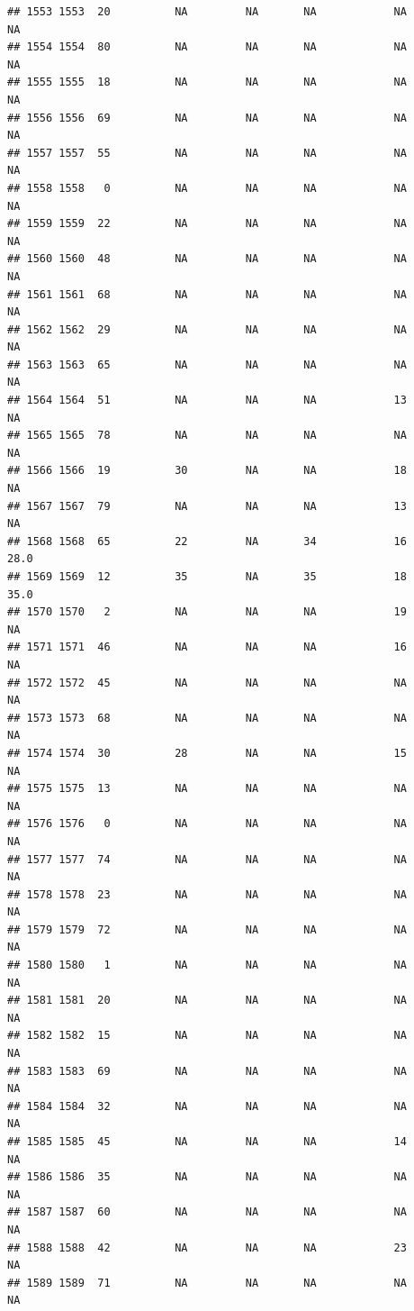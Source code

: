 \documentclass[man]{apa6}
\begin{document}
\begin{verbatim}
## 1553 1553  20          NA         NA       NA            NA       NA
## 1554 1554  80          NA         NA       NA            NA       NA
## 1555 1555  18          NA         NA       NA            NA       NA
## 1556 1556  69          NA         NA       NA            NA       NA
## 1557 1557  55          NA         NA       NA            NA       NA
## 1558 1558   0          NA         NA       NA            NA       NA
## 1559 1559  22          NA         NA       NA            NA       NA
## 1560 1560  48          NA         NA       NA            NA       NA
## 1561 1561  68          NA         NA       NA            NA       NA
## 1562 1562  29          NA         NA       NA            NA       NA
## 1563 1563  65          NA         NA       NA            NA       NA
## 1564 1564  51          NA         NA       NA            13       NA
## 1565 1565  78          NA         NA       NA            NA       NA
## 1566 1566  19          30         NA       NA            18       NA
## 1567 1567  79          NA         NA       NA            13       NA
## 1568 1568  65          22         NA       34            16     28.0
## 1569 1569  12          35         NA       35            18     35.0
## 1570 1570   2          NA         NA       NA            19       NA
## 1571 1571  46          NA         NA       NA            16       NA
## 1572 1572  45          NA         NA       NA            NA       NA
## 1573 1573  68          NA         NA       NA            NA       NA
## 1574 1574  30          28         NA       NA            15       NA
## 1575 1575  13          NA         NA       NA            NA       NA
## 1576 1576   0          NA         NA       NA            NA       NA
## 1577 1577  74          NA         NA       NA            NA       NA
## 1578 1578  23          NA         NA       NA            NA       NA
## 1579 1579  72          NA         NA       NA            NA       NA
## 1580 1580   1          NA         NA       NA            NA       NA
## 1581 1581  20          NA         NA       NA            NA       NA
## 1582 1582  15          NA         NA       NA            NA       NA
## 1583 1583  69          NA         NA       NA            NA       NA
## 1584 1584  32          NA         NA       NA            NA       NA
## 1585 1585  45          NA         NA       NA            14       NA
## 1586 1586  35          NA         NA       NA            NA       NA
## 1587 1587  60          NA         NA       NA            NA       NA
## 1588 1588  42          NA         NA       NA            23       NA
## 1589 1589  71          NA         NA       NA            NA       NA

\end{verbatim}
\end{document}
